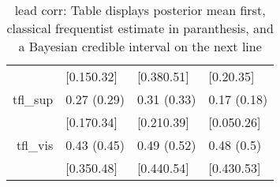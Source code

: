 \begin{table}[ht]
\begin{tabular}{rlll}
                           & [0.150.32] & [0.380.51] & [0.20.35] \\ 
  tfl\_sup & 0.27 (0.29) & 0.31 (0.33) & 0.17 (0.18) \\ 
                             & [0.170.34] & [0.210.39] & [0.050.26] \\ 
  tfl\_vis & 0.43 (0.45) & 0.49 (0.52) & 0.48 (0.5) \\ 
                               & [0.350.48] & [0.440.54] & [0.430.53] \\ 
   \hline
\end{tabular}
\caption{lead corr: Table displays posterior mean first, classical frequentist estimate in paranthesis, and a Bayesian credible interval on the next line} 
\label{lead_corr}
\end{table}
